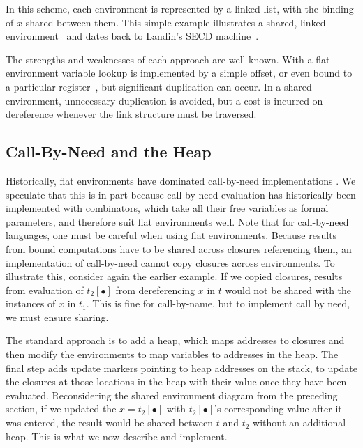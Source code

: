 \documentclass[preprint]{sigplanconf}
\begin{document}
\begin{center}
\end{center}
In this scheme, each environment is represented by a linked list, with
the binding of $x$ shared between them. This simple example
illustrates a shared, linked environment~\cite{appel1988optimizing}
and dates back to Landin's SECD machine~\cite{landin1964mechanical}.

The strengths and weaknesses of each approach are well known.  With a flat
environment variable lookup is implemented by a simple offset, or even
bound to a particular register~\cite{jonesstg, appel2006compiling},
but significant duplication can occur.  In a shared environment, unnecessary
duplication is avoided, but a cost is incurred on dereference whenever the
link structure must be traversed.

\subsection{Call-By-Need and the Heap}

Historically, flat environments have dominated call-by-need implementations
\cite{jonesstg, TIM, johnsson1984efficient, boquist1997grin,
diehl2000abstract}. We speculate that this is in part because call-by-need
evaluation has historically been implemented with combinators, which take all
their free variables as formal parameters, and therefore suit flat environments
well. Note that for call-by-need languages, one must be careful when using flat
environments.  Because results from bound computations have to be shared across
closures referencing them, an implementation of call-by-need cannot copy
closures across environments. To illustrate this, consider again the earlier
example.  If we copied closures, results from evaluation of $t_2[\bullet]$ from
dereferencing $x$ in $t$ would not be shared with the instances of $x$ in
$t_1$.  This is fine for call-by-name, but to implement call by need, we must
ensure sharing.

The standard approach is to add a heap, which maps addresses to closures
\cite{jonesstg, TIM, johnsson1984efficient, sestoft} and then
modify the environments to map variables to addresses in the heap. The final
step adds update markers pointing to heap addresses on the stack, to update
the closures at those locations in the heap with their value once they have been
evaluated.  Reconsidering the shared environment diagram from the preceding
section, if we updated the $x=t_2[\bullet]$ with $t_2[\bullet]$'s corresponding
value after it was entered, the result would be shared between $t$ and $t_2$
without an additional heap. This is what we now describe and implement.
\end{document}
